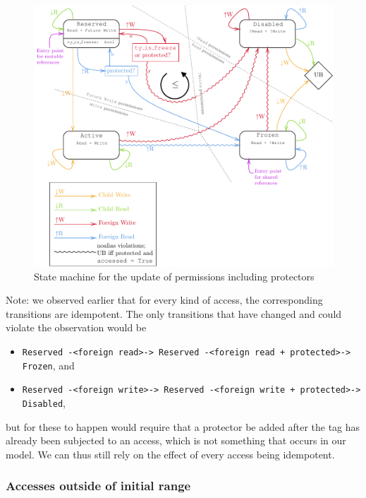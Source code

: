 \documentclass[a4paper,11pt]{article}
\theoremstyle{plain}
\theoremstyle{definition}
\theoremstyle{remark}
\newcommand{\tperm}[1]{\texttt{#1}}
\begin{document}
\begin{figure}
    \includegraphics[width=\textwidth]{../figs/state-machine.pdf}
    \caption{State machine for the update of permissions including protectors}
    \label{fig:state-machine}
\end{figure}

Note: we observed earlier that for every kind of access, the corresponding transitions
are idempotent. The only transitions that have changed and could violate the observation would be

\begin{itemize}
    \item \tperm{Reserved -<foreign read>-> Reserved -<foreign read + protected>-> Frozen}, and
    \item \tperm{Reserved -<foreign write>-> Reserved -<foreign write + protected>-> Disabled},
\end{itemize}

but for these to happen would require that a protector be added after the tag has already been
subjected to an access, which is not something that occurs in our model.
We can thus still rely on the effect of every access being idempotent.

\subsubsection{Accesses outside of initial range}
\end{document}
